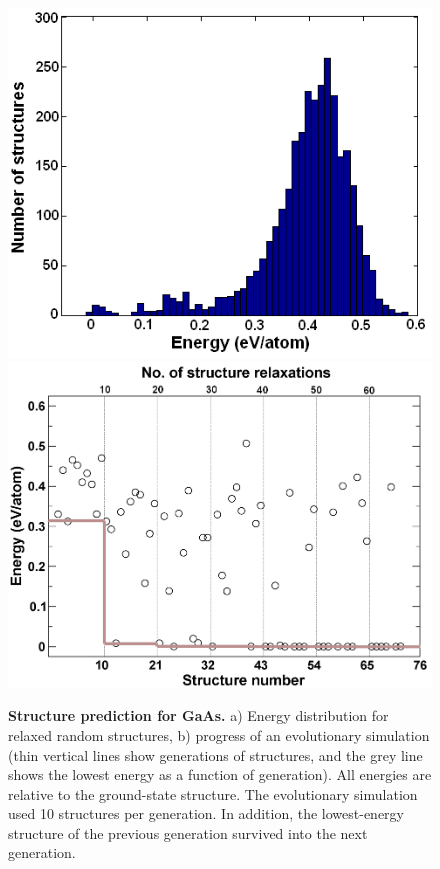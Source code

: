 \documentclass[12pt]{article}
\begin{document}
\begin{figure}[hbtp] \centering
\includegraphics[scale=0.4]{pic/Structure_prediction_for_GaAs_a.png}
\includegraphics[scale=0.2]{pic/Structure_prediction_for_GaAs_b.png}
\caption{\footnotesize \textbf{Structure prediction for GaAs.} a) Energy
distribution for relaxed random structures, b) progress of an evolutionary
simulation (thin vertical lines show generations of structures, and the grey
line shows the lowest energy as a function of generation). All energies are
relative to the ground-state structure. The evolutionary simulation used 10
structures per generation. In addition, the lowest-energy structure of the
previous generation survived into the next generation.}
\label{fig:structure_prediction_GaAs}
\end{figure}
\end{document}
